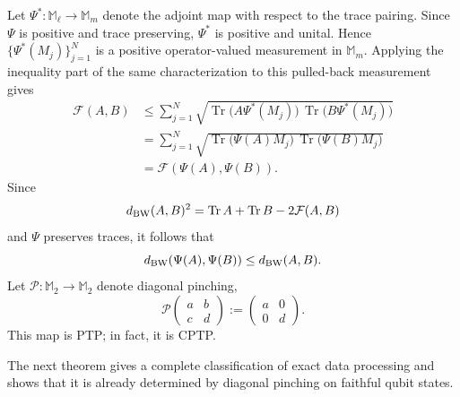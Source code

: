 \documentclass[11pt]{amsart}
\theoremstyle{definition}
\theoremstyle{remark}
\newcommand{\Tr}{\operatorname{Tr}}
\begin{document}
Let $\Psi^*:\mathbb M_\ell\to\mathbb M_m$ denote the adjoint map with
respect to the trace pairing.  Since $\Psi$ is positive and trace
preserving, $\Psi^*$ is positive and unital.  Hence
$\{\Psi^*(M_j)\}_{j=1}^N$ is a positive operator-valued measurement in
$\mathbb M_m$.  Applying the inequality part of the same characterization
to this pulled-back measurement gives
\begin{align*}
	\mathcal F(A,B)
	&\le
	\sum_{j=1}^N
	\sqrt{\Tr\!\bigl(A\Psi^*(M_j)\bigr)\,
		\Tr\!\bigl(B\Psi^*(M_j)\bigr)}\\
	&=
	\sum_{j=1}^N
	\sqrt{\Tr\!\bigl(\Psi(A)M_j\bigr)\,
		\Tr\!\bigl(\Psi(B)M_j\bigr)}\\
	&=\mathcal F(\Psi(A),\Psi(B)).
\end{align*}
Since
\[
d_{\rm BW}(A,B)^2
=\Tr A+\Tr B-2\mathcal F(A,B)
\]
and $\Psi$ preserves traces, it follows that
\begin{equation}\label{eq:bw-contractivity}
	d_{\rm BW}(\Psi(A),\Psi(B))
	\le d_{\rm BW}(A,B).
\end{equation}
	Let $\mathcal P:\mathbb M_2\to\mathbb M_2$ denote diagonal pinching,
	\[
	\mathcal P\!\begin{pmatrix}a&b\\c&d\end{pmatrix}
	:=\begin{pmatrix}a&0\\0&d\end{pmatrix}.
	\]
This map is PTP; in fact, it is CPTP.

The next theorem gives a complete classification of exact data processing
and shows that it is already determined by diagonal pinching on faithful
qubit states.
\end{document}
